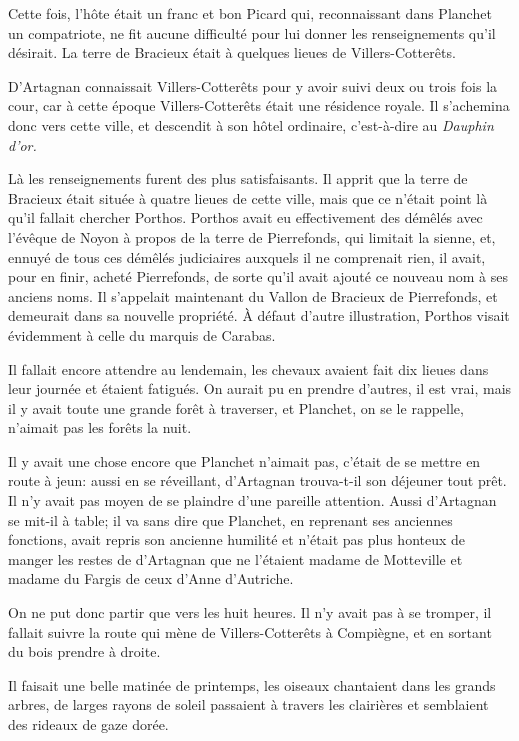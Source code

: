 Cette fois, l'hôte était un franc et bon Picard qui, reconnaissant dans Planchet un compatriote, ne fit aucune difficulté pour lui donner les renseignements qu'il désirait. La terre de Bracieux était à quelques lieues de Villers-Cotterêts.

D'Artagnan connaissait Villers-Cotterêts pour y avoir suivi deux ou trois fois la cour, car à cette époque Villers-Cotterêts était une résidence royale. Il s'achemina donc vers cette ville, et descendit à son hôtel ordinaire, c'est-à-dire au \textit{Dauphin d'or.}

Là les renseignements furent des plus satisfaisants. Il apprit que la terre de Bracieux était située à quatre lieues de cette ville, mais que ce n'était point là qu'il fallait chercher Porthos. Porthos avait eu effectivement des démêlés avec l'évêque de Noyon à propos de la terre de Pierrefonds, qui limitait la sienne, et, ennuyé de tous ces démêlés judiciaires auxquels il ne comprenait rien, il avait, pour en finir, acheté Pierrefonds, de sorte qu'il avait ajouté ce nouveau nom à ses anciens noms. Il s'appelait maintenant du Vallon de Bracieux de Pierrefonds, et demeurait dans sa nouvelle propriété. À défaut d'autre illustration, Porthos visait évidemment à celle du marquis de Carabas.

Il fallait encore attendre au lendemain, les chevaux avaient fait dix lieues dans leur journée et étaient fatigués. On aurait pu en prendre d'autres, il est vrai, mais il y avait toute une grande forêt à traverser, et Planchet, on se le rappelle, n'aimait pas les forêts la nuit.

Il y avait une chose encore que Planchet n'aimait pas, c'était de se mettre en route à jeun: aussi en se réveillant, d'Artagnan trouva-t-il son déjeuner tout prêt. Il n'y avait pas moyen de se plaindre d'une pareille attention. Aussi d'Artagnan se mit-il à table; il va sans dire que Planchet, en reprenant ses anciennes fonctions, avait repris son ancienne humilité et n'était pas plus honteux de manger les restes de d'Artagnan que ne l'étaient madame de Motteville et madame du Fargis de ceux d'Anne d'Autriche.

On ne put donc partir que vers les huit heures. Il n'y avait pas à se tromper, il fallait suivre la route qui mène de Villers-Cotterêts à Compiègne, et en sortant du bois prendre à droite.

Il faisait une belle matinée de printemps, les oiseaux chantaient dans les grands arbres, de larges rayons de soleil passaient à travers les clairières et semblaient des rideaux de gaze dorée.

